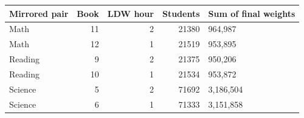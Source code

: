 \begin{tabular}{lrrrl}
\toprule
Mirrored pair & Book & LDW hour & Students & Sum of final weights \\
\midrule
Math & 11 & 2 & 21380 & 964,987 \\
Math & 12 & 1 & 21519 & 953,895 \\
Reading & 9 & 2 & 21375 & 950,206 \\
Reading & 10 & 1 & 21534 & 953,872 \\
Science & 5 & 2 & 71692 & 3,186,504 \\
Science & 6 & 1 & 71333 & 3,151,858 \\
\bottomrule
\end{tabular}

